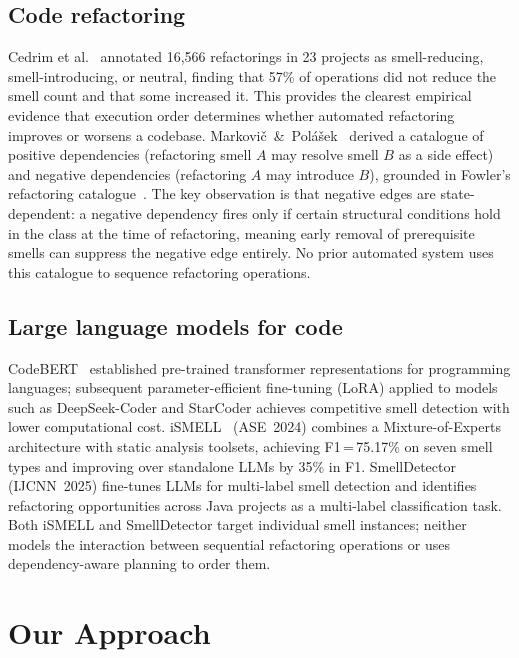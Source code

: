 \documentclass[conference]{IEEEtran}
\begin{document}
\subsection{Code refactoring}

Cedrim et al.~\cite{cedrim2017} annotated 16,566 refactorings in 23 projects
as smell-reducing, smell-introducing, or neutral, finding that 57\% of
operations did not reduce the smell count and that some increased it.
This provides the clearest empirical evidence that execution order determines
whether automated refactoring improves or worsens a codebase.
Markovič~\&~Polášek~\cite{markovic2016refaktorovanie} derived a catalogue of
positive dependencies (refactoring smell $A$ may resolve smell $B$ as a side
effect) and negative dependencies (refactoring $A$ may introduce $B$),
grounded in Fowler's refactoring catalogue~\cite{Fowler1999}.
The key observation is that negative edges are state-dependent: a negative
dependency fires only if certain structural conditions hold in the class at
the time of refactoring, meaning early removal of prerequisite smells can
suppress the negative edge entirely.
No prior automated system uses this catalogue to sequence refactoring
operations.

\subsection{Large language models for code}

CodeBERT~\cite{feng2020codebert} established pre-trained transformer
representations for programming languages; subsequent parameter-efficient
fine-tuning (LoRA) applied to models such as DeepSeek-Coder and StarCoder
achieves competitive smell detection with lower computational cost.
iSMELL~\cite{10.1145/3691620.3695508} (ASE~2024) combines a Mixture-of-Experts
architecture with static analysis toolsets, achieving F1\,=\,75.17\% on seven
smell types and improving over standalone LLMs by 35\% in F1.
SmellDetector~\cite{liang2025smelldetector} (IJCNN~2025) fine-tunes LLMs for
multi-label smell detection and identifies refactoring opportunities across
Java projects as a multi-label classification task.
Both iSMELL and SmellDetector target individual smell instances; neither
models the interaction between sequential refactoring operations or uses
dependency-aware planning to order them.

\section{Our Approach}
\end{document}
